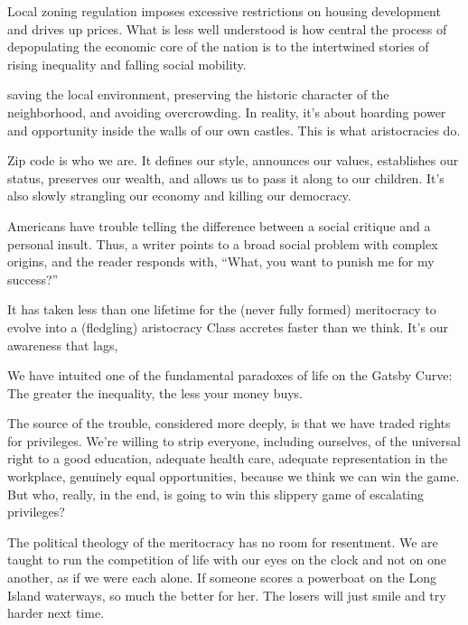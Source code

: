 \documentclass[
]{book}
\begin{document}
Local zoning
regulation imposes excessive restrictions on housing development and
drives up prices. What is less well understood is how central the
process of depopulating the economic core of the nation is to the
intertwined stories of rising inequality and falling social mobility.

saving the local environment, preserving
the historic character of the neighborhood, and avoiding
overcrowding. In reality, it's about hoarding power and opportunity
inside the walls of our own castles. This is what aristocracies do.

Zip code is who we are. It defines our style, announces our values,
establishes our status, preserves our wealth, and allows us to pass it
along to our children. It's also slowly strangling our economy and
killing our democracy.

Americans have
trouble telling the difference between a social critique and a personal
insult. Thus, a writer points to a broad social problem with complex
origins, and the reader responds with, ``What, you want to punish me
for my success?''

It has taken less than one lifetime
for the (never fully formed) meritocracy to evolve into a (fledgling)
aristocracy
Class accretes faster than we think. It's our awareness that
lags,

We have intuited one of the fundamental paradoxes of
life on the Gatsby Curve: The greater the inequality, the less your
money buys.

The source of the trouble, considered more deeply, is that we have
traded rights for privileges. We're willing to strip everyone, including
ourselves, of the universal right to a good education, adequate health
care, adequate representation in the workplace, genuinely equal
opportunities, because we think we can win the game. But who,
really, in the end, is going to win this slippery game of escalating
privileges?

The political theology of the meritocracy has no room for
resentment. We are taught to run the competition of life with our
eyes on the clock and not on one another, as if we were each alone. If
someone scores a powerboat on the Long Island waterways, so much
the better for her. The losers will just smile and try harder next time.
\end{document}
